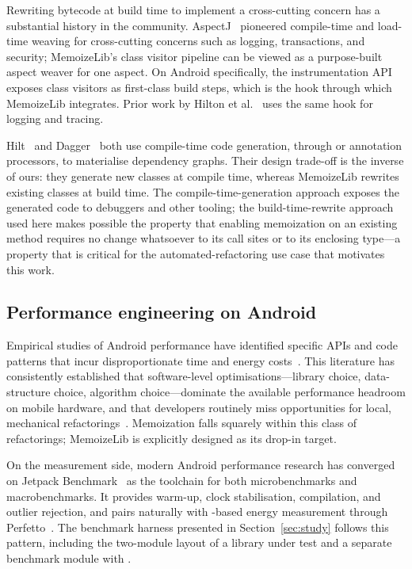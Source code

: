 Rewriting bytecode at build time to implement a cross-cutting concern has a substantial history in the \jvm community. AspectJ~\cite{aspectj} pioneered compile-time and load-time weaving for cross-cutting concerns such as logging, transactions, and security; MemoizeLib's class visitor pipeline can be viewed as a purpose-built aspect weaver for one aspect. On Android specifically, the \agp instrumentation API~\cite{agp_instrumentation} exposes \asm class visitors as first-class build steps, which is the hook through which MemoizeLib integrates. Prior work by Hilton et al.~\cite{hilton_bytecode} uses the same hook for logging and tracing.

Hilt~\cite{hilt} and Dagger~\cite{dagger} both use compile-time code generation, through \ksp or annotation processors, to materialise dependency graphs. Their design trade-off is the inverse of ours: they generate new classes at compile time, whereas MemoizeLib rewrites existing classes at build time. The compile-time-generation approach exposes the generated code to debuggers and other tooling; the build-time-rewrite approach used here makes possible the property that enabling memoization on an existing method requires no change whatsoever to its call sites or to its enclosing type---a property that is critical for the automated-refactoring use case that motivates this work.

\subsection{Performance engineering on Android}

Empirical studies of Android performance have identified specific APIs and code patterns that incur disproportionate time and energy costs~\cite{patterns,reduce_bytecode_energy,energy_smells_palomba,marco_refactorings_wild}. This literature has consistently established that software-level optimisations---library choice, data-structure choice, algorithm choice---dominate the available performance headroom on mobile hardware, and that developers routinely miss opportunities for local, mechanical refactorings~\cite{rodrigo_fix_static_warnings2019,empirical_rua}. Memoization falls squarely within this class of refactorings; MemoizeLib is explicitly designed as its drop-in target.

On the measurement side, modern Android performance research has converged on Jetpack Benchmark~\cite{jetpackbenchmark} as the toolchain for both microbenchmarks and macrobenchmarks. It provides warm-up, clock stabilisation, \aot compilation, and outlier rejection, and pairs naturally with \odpm-based energy measurement through Perfetto~\cite{perfetto}. The benchmark harness presented in Section~\ref{sec:study} follows this pattern, including the two-module layout of a library under test and a separate benchmark module with .


